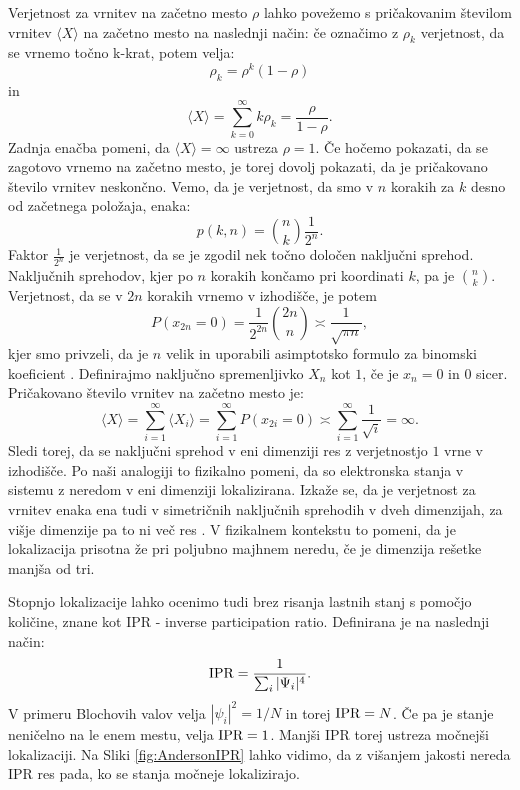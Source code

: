 Verjetnost za vrnitev na začetno mesto $\rho$ lahko povežemo s pričakovanim številom vrnitev $\langle X \rangle$ na začetno mesto na naslednji način:
če označimo z $\rho_k$ verjetnost, da se vrnemo točno k-krat, potem velja:
\begin{equation}
\rho_k = \rho^k(1-\rho)
\end{equation}
in
\begin{equation}
\langle X \rangle = \sum_{k=0}^\infty k \rho_k = \frac{\rho}{1-\rho}.
\end{equation}
Zadnja enačba pomeni, da $\langle X \rangle = \infty$ ustreza $\rho = 1$. Če hočemo pokazati, da se zagotovo vrnemo na začetno mesto, je torej dovolj pokazati, da je pričakovano število vrnitev neskončno.
Vemo, da je verjetnost, da smo v $n$ korakih za $k$ desno od začetnega položaja, enaka:
\begin{equation}
p(k,n) = \binom{n}{k}\frac{1}{2^n}.
\end{equation}
Faktor $\frac{1}{2^n}$ je verjetnost, da se je zgodil nek točno določen naključni sprehod. Naključnih sprehodov, kjer po $n$ korakih končamo pri koordinati $k$, pa je $\binom{n}{k}$.
Verjetnost, da se v $2n$ korakih vrnemo v izhodišče, je potem
\begin{equation}
P(x_{2n}=0) = \frac{1}{2^{2n}} \binom{2n}{n} \asymp \frac{1}{\sqrt{\pi n}},
\end{equation}
kjer smo privzeli, da je $n$ velik in uporabili asimptotsko formulo za binomski koeficient \cite{binomial}.
Definirajmo naključno spremenljivko $X_n$ kot $1$, če je $x_n=0$ in $0$ sicer. Pričakovano število vrnitev na začetno mesto je:
\begin{equation}
\langle X \rangle = \sum_{i=1}^\infty \langle X_i \rangle = \sum_{i=1}^\infty P(x_{2i}=0) \asymp \sum_{i=1}^\infty \frac{1}{\sqrt{i}} = \infty.
\end{equation}
Sledi torej, da se naključni sprehod v eni dimenziji res z verjetnostjo $1$ vrne v izhodišče.
Po naši analogiji to fizikalno pomeni, da so elektronska stanja v sistemu z neredom v eni dimenziji lokalizirana.
Izkaže se, da je verjetnost za vrnitev enaka ena tudi v simetričnih naključnih sprehodih v dveh dimenzijah, za višje dimenzije pa to ni več res \cite{randomwalk}.
V fizikalnem kontekstu to pomeni, da je lokalizacija prisotna že pri poljubno majhnem neredu, če je dimenzija rešetke manjša od tri.

Stopnjo lokalizacije lahko ocenimo tudi brez risanja lastnih stanj s pomočjo količine, znane kot IPR - inverse participation ratio. Definirana je na naslednji način:
\begin{equation}
\textup{IPR} = \frac{1}{\sum_i |\Psi_i|^4}.
\end{equation}
V primeru Blochovih valov velja $|\psi_i|^2 = 1/N$ in torej $\textup{IPR} = N$.
Če pa je stanje neničelno na le enem mestu, velja $\textup{IPR}=1$.
Manjši IPR torej ustreza močnejši lokalizaciji. Na Sliki \ref{fig:AndersonIPR} lahko vidimo, da z višanjem jakosti nereda IPR res pada, ko se stanja močneje lokalizirajo.

